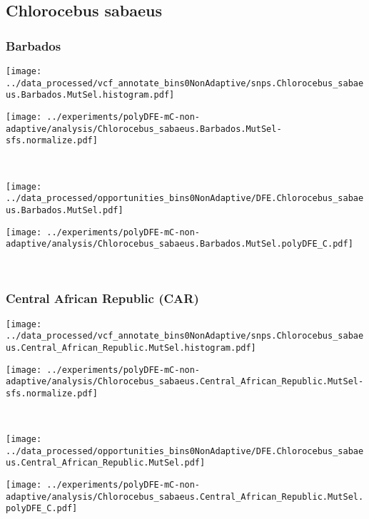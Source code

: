 \subsection{Chlorocebus sabaeus}

\subsubsection{Barbados}

\begin{minipage}{0.49\linewidth}
    \texttt{[image: ../data\_processed/vcf\_annotate\_bins0NonAdaptive/snps.Chlorocebus\_sabaeus.Barbados.MutSel.histogram.pdf]}
\end{minipage}
\begin{minipage}{0.49\linewidth}
    \texttt{[image: ../experiments/polyDFE-mC-non-adaptive/analysis/Chlorocebus\_sabaeus.Barbados.MutSel-sfs.normalize.pdf]}
\end{minipage}
\\
\begin{minipage}{0.49\linewidth}
    \texttt{[image: ../data\_processed/opportunities\_bins0NonAdaptive/DFE.Chlorocebus\_sabaeus.Barbados.MutSel.pdf]}
\end{minipage}
\begin{minipage}{0.49\linewidth}
    \texttt{[image: ../experiments/polyDFE-mC-non-adaptive/analysis/Chlorocebus\_sabaeus.Barbados.MutSel.polyDFE\_C.pdf]}
\end{minipage}
\\

\subsubsection{Central African Republic (CAR)}

\begin{minipage}{0.49\linewidth}
    \texttt{[image: ../data\_processed/vcf\_annotate\_bins0NonAdaptive/snps.Chlorocebus\_sabaeus.Central\_African\_Republic.MutSel.histogram.pdf]}
\end{minipage}
\begin{minipage}{0.49\linewidth}
    \texttt{[image: ../experiments/polyDFE-mC-non-adaptive/analysis/Chlorocebus\_sabaeus.Central\_African\_Republic.MutSel-sfs.normalize.pdf]}
\end{minipage}
\\
\begin{minipage}{0.49\linewidth}
    \texttt{[image: ../data\_processed/opportunities\_bins0NonAdaptive/DFE.Chlorocebus\_sabaeus.Central\_African\_Republic.MutSel.pdf]}
\end{minipage}
\begin{minipage}{0.49\linewidth}
    \texttt{[image: ../experiments/polyDFE-mC-non-adaptive/analysis/Chlorocebus\_sabaeus.Central\_African\_Republic.MutSel.polyDFE\_C.pdf]}
\end{minipage}
\\

